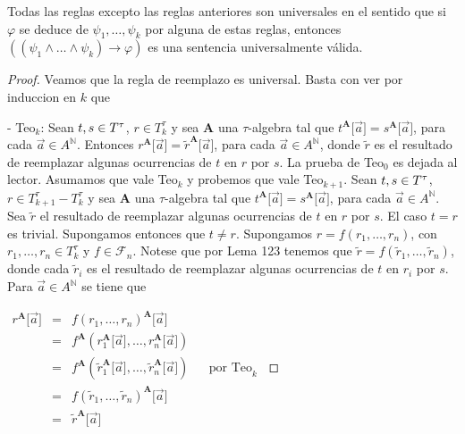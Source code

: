   \begin{lemma} \label{lemma_87}
    \PN Todas las reglas excepto las reglas anteriores son universales en el sentido que si $\varphi$ se deduce de
    $\psi_{1}, \dotsc, \psi_{k}$ por alguna de estas reglas, entonces $\left((\psi_{1} \wedge \dotsc \wedge \psi_{k})
    \rightarrow \varphi \right)$ es una sentencia universalmente válida.
  \end{lemma}
  \begin{proof}
    Veamos que la regla de reemplazo es universal. Basta con ver por induccion en $k$ que

    - Teo$_{k}$: Sean $t,s\in T^{\tau}$, $r\in T_{k}^{\tau }$ y sea $ \mathbf{A}$ una $\tau $-algebra tal que $t^{\mathbf{A}}\lbrack\vec{a}\rbrack=s^{\mathbf{A }}\lbrack\vec{a}\rbrack$, para cada $\vec{a}\in A^{\mathbb{N}}$. Entonces $r^{\mathbf{A} }\lbrack\vec{a}\rbrack=\tilde{r}^{\mathbf{A}}\lbrack\vec{a}\rbrack$, para cada $\vec{a}\in A^{ \mathbb{N}}$, donde $\tilde{r}$ es el resultado de reemplazar algunas ocurrencias de $t$ en $r$ por $s.$
    La prueba de Teo$_{0}$ es dejada al lector. Asumamos que vale Teo$_{k}$ y probemos que vale Teo$_{k+1}$. Sean $t,s\in T^{\tau}$, $r\in T_{k+1}^{\tau }-T_{k}^{\tau }$ y sea $\mathbf{A}$ una $\tau $-algebra tal que $t^{\mathbf{A }}\lbrack\vec{a}\rbrack=s^{\mathbf{A}}\lbrack\vec{a}\rbrack$, para cada $\vec{a}\in A^{\mathbb{N}}$. Sea $\tilde{r}$ el resultado de reemplazar algunas ocurrencias de $t$ en $r$ por $s$. El caso $t=r$ es trivial. Supongamos entonces que $t\neq r$. Supongamos $r=f(r_{1}, \dotsc, r_{n})$, con $r_{1}, \dotsc, r_{n}\in T_{k}^{\tau }$ y $ f\in \mathcal{F}_{n}$. Notese que por Lema 123 tenemos que $\tilde{r}=f(\tilde{r}_{1}, \dotsc, \tilde{r}_{n})$, donde cada $\tilde{r} _{i} $ es el resultado de reemplazar algunas ocurrencias de $t$ en $r_{i}$ por $s$. Para $\vec{a}\in A^{\mathbb{N}}$ se tiene que

    $\displaystyle \begin{array}{cclll} r^{\mathbf{A}}\lbrack\vec{a}\rbrack & = & f(r_{1}, \dotsc, r_{n})^{\mathbf{A}}\lbrack\vec{a}\rbrack & & \\ & = & f^{\mathbf{A}}(r_{1}^{\mathbf{A}}\lbrack\vec{a}\rbrack, \dotsc, r_{n}^{\mathbf{A}}\lbrack\vec{ a}\rbrack) & & \\ & = & f^{\mathbf{A}}(\tilde{r}_{1}^{\mathbf{A}}\lbrack\vec{a}\rbrack, \dotsc, \tilde{r}_{n}^{ \mathbf{A}}\lbrack\vec{a}\rbrack) & & \text{por Teo}_{k} \\ & = & f(\tilde{r}_{1}, \dotsc, \tilde{r}_{n})^{\mathbf{A}}\lbrack\vec{a}\rbrack & & \\ & = & \tilde{r}^{\mathbf{A}}\lbrack\vec{a}\rbrack & & \end{array} $


\end{proof}
